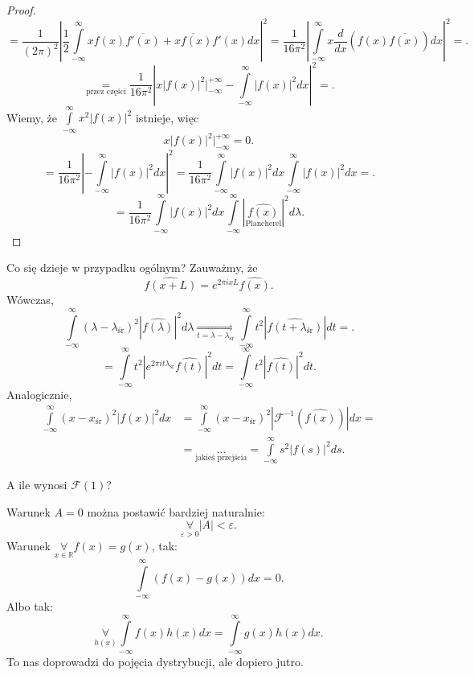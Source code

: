 \documentclass[../main.tex]{subfiles}
\begin{document}
\begin{proof}
\[\]
    \[
        =\frac{1}{(2\pi)^2}\left|\frac{1}{2} \int\limits_{-\infty}^{\infty} xf(x) \overline{f'(x)} + \overline{xf(x)} f'(x) dx\right|^2 = \frac{1}{16\pi^2} \left| \int\limits_{-\infty}^{\infty} x \frac{d}{dx}\left( f(x)\overline{f(x)} \right)dx\right|^2 =
.\]
\[
    \underset{\text{przez części}}{=} \frac{1}{16\pi^2}\left| x\left| f(x) \right| ^2 \Big|_{-\infty}^{+\infty} - \int\limits_{-\infty}^{\infty} \left| f(x) \right| ^2 dx \right|^2=
.\]
Wiemy, że $\int\limits_{-\infty}^{\infty}   x^2 \left| f(x) \right| ^2$ istnieje, więc
\[
    x\left| f(x) \right| ^2 \Big|_{-\infty}^{+\infty} = 0
.\]
\[
    = \frac{1}{16\pi^2}\left| -\int\limits_{-\infty}^{\infty} \left| f(x) \right| ^2dx  \right| ^2 = \frac{1}{16\pi^2} \int\limits_{-\infty}^{\infty} \left| f(x) \right| ^2dx \int\limits_{-\infty}^{\infty} \left| f(x) \right| ^2 dx =
.\]
\[
    = \frac{1}{16\pi^2}\int\limits_{-\infty}^{\infty} \left| f(x) \right| ^2 dx \int\limits_{-\infty}^{\infty} \left| \underset{\text{Plancherel}}{\widehat{f(x)}} \right|^2 d\lambda
.\]
\end{proof}
Co się dzieje w przypadku ogólnym? Zauważmy, że
\[
    \widehat{f(x+L)} = e^{2\pi ixL}\widehat{f(x)}
.\]
Wówczas,
\[
    \int\limits_{-\infty}^{\infty} \left( \lambda - \lambda_{\text{śr}} \right)^2 \left| \widehat{f(\lambda)} \right|^2 d\lambda \underset{t = \lambda - \lambda_{\text{śr}}}{\Longrightarrow} \int\limits_{-\infty}^{\infty}  t^2 \left| \widehat{f(t + \lambda_{\text{śr}})} \right|dt =
.\]
\[
    = \int\limits_{-\infty}^{\infty} t^2 \left| e^{2\pi i t \lambda_{\text{śr}}} \widehat{f(t)}\right|^2 dt = \int\limits_{-\infty}^{\infty}  t^2 \left| \widehat{f(t)} \right|^2 dt
.\]
Analogicznie,
\begin{align*}
    \int\limits_{-\infty}^{\infty} \left( x-x_{\text{śr}} \right) ^2 \left| f(x) \right| ^2 dx &= \int\limits_{-\infty}^{\infty} \left( x - x_{\text{śr}} \right) ^2 \left| \mathcal{F}^{-1}\left( \widehat{f(x)} \right)  \right| dx =\\
    &= \underset{\text{jakieś przejścia}}{\ldots} = \int\limits_{-\infty}^{\infty}  s^2 \left| f(s) \right| ^2 ds
.\end{align*}
\begin{pytanie}
    A ile wynosi $\mathcal{F}(1)$?
\end{pytanie}
Warunek $A = 0$ można postawić bardziej naturalnie:
 \[
    \underset{\varepsilon > 0}{\forall} \left| A \right|  < \varepsilon
.\]
Warunek $\underset{x\in \mathbb{R}}{\forall} f(x) = g(x)$, tak:
\[
    \int\limits_{-\infty}^{\infty} \left( f(x) - g(x) \right)dx = 0
.\]
Albo tak:
\[
    \underset{h(x)}{\forall} \int\limits_{-\infty}^{\infty} f(x)h(x)dx = \int\limits_{-\infty}^{\infty} g(x)h(x) dx
.\]
To nas doprowadzi do pojęcia dystrybucji, ale dopiero jutro.
\end{document}
